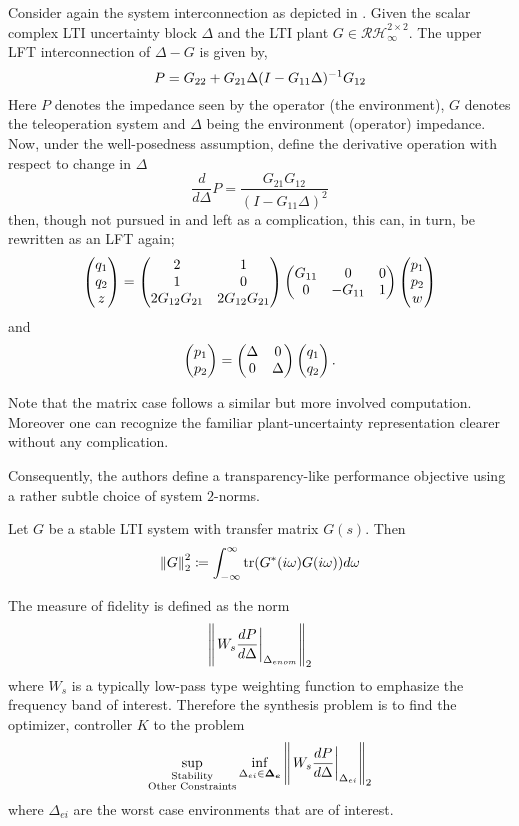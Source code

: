 Consider again the system interconnection as depicted in . Given the scalar complex LTI uncertainty block 
$\Delta$ and the LTI plant $G\in\mathcal{RH}_\infty^{2\times 2}$. The upper LFT interconnection of $\Delta-G$ is given by, 
\[
P = G_{22}+G_{21}\Delta(I-G_{11}\Delta)^{-1}G_{12}
\]
Here $P$ denotes the impedance seen by the operator (the environment), $G$ denotes the teleoperation system and $\Delta$ being the 
environment (operator) impedance. Now, under the well-posedness assumption, define the derivative operation with respect to change in $\Delta$
\[
\frac{d}{d\Delta} P = \frac{G_{21}G_{12}}{(I-G_{11}\Delta)^2}
\]
then, though not pursued in \cite{cavusoglu} and left as a complication, this can, in turn, be rewritten as an LFT again;
\[
\begin{pmatrix}q_1\\q_2\\z\end{pmatrix} = \begin{pmatrix}2&1\\1&0\\2G_{12}G_{21}&2G_{12}G_{21}\end{pmatrix}\begin{pmatrix}G_{11}&0&0\\0&-G_{11}&1\end{pmatrix} \begin{pmatrix}p_1\\p_2\\w\end{pmatrix}
\]
and 
\[
\begin{pmatrix}p_1\\p_2\end{pmatrix} = \begin{pmatrix}\Delta &0\\0 &\Delta\end{pmatrix}\begin{pmatrix}q_1\\q_2\end{pmatrix}.
\]

Note that the matrix case follows a similar but more involved computation. Moreover one can recognize the familiar
plant-uncertainty representation clearer without any complication. 

Consequently, the authors define a transparency-like performance objective using a rather subtle choice of system $2$-norms. 

\begin{define*}Let $G$ be a stable LTI system with transfer matrix $G(s)$. Then 
\[
\displaystyle \left\| G \right\|_2^2 \coloneqq \int_{-\infty}^\infty{\operatorname{tr}(G^*(i\omega)G(i\omega))}d\omega
\] 
\end{define*}
\noindent The measure of fidelity is defined as the norm
\[
\displaystyle \left\| \left.W_s\frac{dP}{d\Delta}\right|_{\Delta_{enom}} \right\|_2
\]
where $W_s$ is a typically low-pass type weighting function to emphasize the frequency band of interest. Therefore
the synthesis problem is to find the optimizer, controller $K$ to the problem
\[
\sup_{\substack{\text{Stability}\\\text{Other Constraints}}}\inf_{\Delta_{ei}\in\bm{\Delta_e}}
\displaystyle \left\| \left.W_s\frac{dP}{d\Delta}\right|_{\Delta_{ei}} \right\|_2
\]
where $\Delta_{ei}$ are the worst case environments that are of interest.


